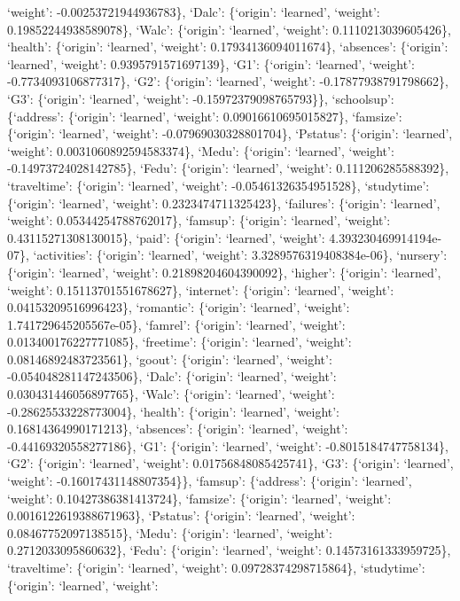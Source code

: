 \documentclass[
]{article}
\begin{document}
`weight': -0.00253721944936783\}, `Dalc': \{`origin': `learned',
`weight': 0.19852244938589078\}, `Walc': \{`origin': `learned',
`weight': 0.1110213039605426\}, `health': \{`origin': `learned',
`weight': 0.17934136094011674\}, `absences': \{`origin': `learned',
`weight': 0.9395791571697139\}, `G1': \{`origin': `learned', `weight':
-0.7734093106877317\}, `G2': \{`origin': `learned', `weight':
-0.17877938791798662\}, `G3': \{`origin': `learned', `weight':
-0.15972379098765793\}\}, `schoolsup': \{`address': \{`origin':
`learned', `weight': 0.09016610695015827\}, `famsize': \{`origin':
`learned', `weight': -0.07969030328801704\}, `Pstatus': \{`origin':
`learned', `weight': 0.0031060892594583374\}, `Medu': \{`origin':
`learned', `weight': -0.14973724028142785\}, `Fedu': \{`origin':
`learned', `weight': 0.111206285588392\}, `traveltime': \{`origin':
`learned', `weight': -0.05461326354951528\}, `studytime': \{`origin':
`learned', `weight': 0.2323474711325423\}, `failures': \{`origin':
`learned', `weight': 0.05344254788762017\}, `famsup': \{`origin':
`learned', `weight': 0.43115271308130015\}, `paid': \{`origin':
`learned', `weight': 4.393230469914194e-07\}, `activities': \{`origin':
`learned', `weight': 3.3289576319408384e-06\}, `nursery': \{`origin':
`learned', `weight': 0.21898204604390092\}, `higher': \{`origin':
`learned', `weight': 0.15113701551678627\}, `internet': \{`origin':
`learned', `weight': 0.04153209516996423\}, `romantic': \{`origin':
`learned', `weight': 1.741729645205567e-05\}, `famrel': \{`origin':
`learned', `weight': 0.013400176227771085\}, `freetime': \{`origin':
`learned', `weight': 0.08146892483723561\}, `goout': \{`origin':
`learned', `weight': -0.054048281147243506\}, `Dalc': \{`origin':
`learned', `weight': 0.030431446056897765\}, `Walc': \{`origin':
`learned', `weight': -0.28625533228773004\}, `health': \{`origin':
`learned', `weight': 0.16814364990171213\}, `absences': \{`origin':
`learned', `weight': -0.44169320558277186\}, `G1': \{`origin':
`learned', `weight': -0.8015184747758134\}, `G2': \{`origin': `learned',
`weight': 0.01756848085425741\}, `G3': \{`origin': `learned', `weight':
-0.16017431148807354\}\}, `famsup': \{`address': \{`origin': `learned',
`weight': 0.10427386381413724\}, `famsize': \{`origin': `learned',
`weight': 0.0016122619388671963\}, `Pstatus': \{`origin': `learned',
`weight': 0.08467752097138515\}, `Medu': \{`origin': `learned',
`weight': 0.2712033095860632\}, `Fedu': \{`origin': `learned', `weight':
0.14573161333959725\}, `traveltime': \{`origin': `learned', `weight':
0.09728374298715864\}, `studytime': \{`origin': `learned', `weight':
\end{document}
